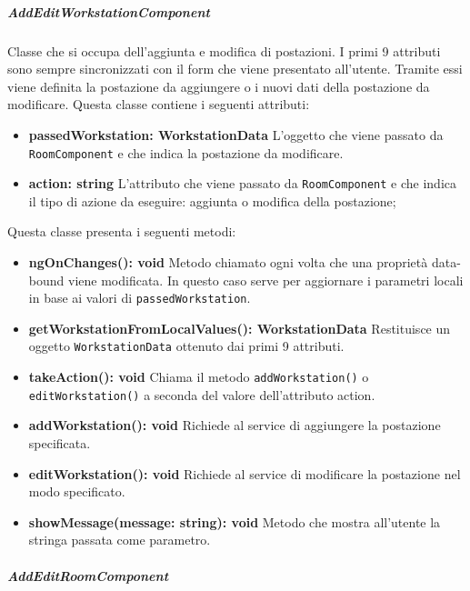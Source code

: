 \subparagraph{AddEditWorkstationComponent}
Classe che si occupa dell'aggiunta e modifica di postazioni. I primi 9 attributi sono sempre sincronizzati con il form che viene presentato all'utente. Tramite essi viene definita la postazione da aggiungere o i nuovi dati della postazione da modificare.\newline
Questa classe contiene i seguenti attributi:
\begin{itemize}
	\item \textbf{passedWorkstation: WorkstationData } \newline
	L'oggetto che viene passato da \texttt{RoomComponent} e che indica la postazione da modificare.
	\item \textbf{action: string} \newline
	L'attributo che viene passato da \texttt{RoomComponent} e che indica il tipo di azione da eseguire: aggiunta o modifica della postazione;
\end{itemize}
Questa classe presenta i seguenti metodi:
\begin{itemize}
	\item \textbf{ngOnChanges(): void } \newline
	Metodo chiamato ogni volta che una proprietà data-bound viene modificata. In questo caso serve per aggiornare i parametri locali in base ai valori di \texttt{passedWorkstation}.
	\item \textbf{getWorkstationFromLocalValues(): WorkstationData } \newline
	Restituisce un oggetto \texttt{WorkstationData} ottenuto dai primi 9 attributi.
	\item \textbf{takeAction(): void } \newline
	Chiama il metodo \texttt{addWorkstation()} o \texttt{editWorkstation()} a seconda del valore dell'attributo action.
	\item \textbf{addWorkstation(): void } \newline
	Richiede al service di aggiungere la postazione specificata.
	\item \textbf{editWorkstation(): void} \newline
	Richiede al service di modificare la postazione nel modo specificato.
	\item \textbf{showMessage(message: string): void} \newline
	Metodo che mostra all'utente la stringa passata come parametro.
	
\end{itemize}
\subparagraph{AddEditRoomComponent}
